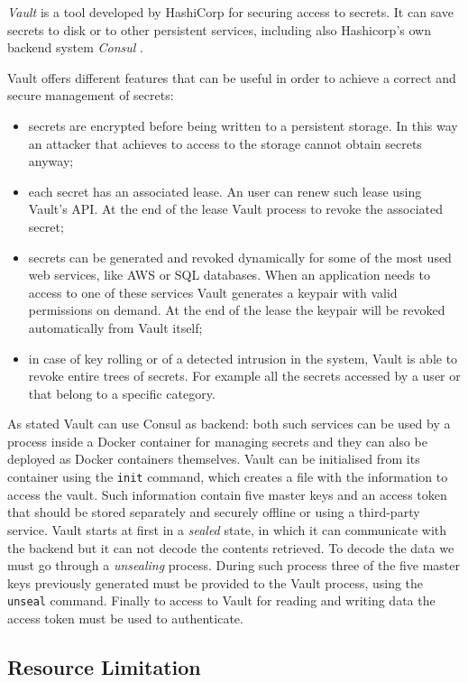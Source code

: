 \documentclass[a4paper,12pt]{article}
\newcommand{\code}[1]{\lstinline|#1|}
\begin{document}
\textit{Vault} \cite{hashicorp_vault} is a tool developed by HashiCorp for
securing access to secrets. It can save secrets to disk or to other persistent
services, including also Hashicorp's own backend system
\textit{Consul} \cite{hashicorp_consul}.\par Vault offers different features that
can be useful in order to achieve a correct and secure management of secrets:
\begin{itemize}
  \item secrets are encrypted before being written to a persistent storage. In
  this way an attacker that achieves to access to the storage cannot
  obtain secrets anyway;
  \item each secret has an associated lease. An user can renew such lease using
  Vault's API. At the end of the lease Vault process to revoke the associated
  secret;
  \item secrets can be generated and revoked dynamically for some of the most
  used web services, like AWS or SQL databases. When an application needs to
  access to one of these services Vault generates a keypair with valid
  permissions on demand. At the end of the lease the keypair will be revoked
  automatically from Vault itself;
  \item in case of key rolling or of a detected intrusion in the system, Vault
  is able to revoke entire trees of secrets. For example all the secrets
  accessed by a user or that belong to a specific category.
\end{itemize}
\par As stated Vault can use Consul as backend: both such services can be used by a process
inside a Docker container for managing secrets and they can also be deployed as
Docker containers themselves. Vault can be initialised from its container using
the \code{init} command, which creates a file with the information to access
the vault. Such information contain five master keys and an access token that
should  be stored separately and securely offline or using a third-party
service. Vault starts at first in a \textit{sealed} state, in which it can
communicate with the backend but it can not decode the contents retrieved. To
decode the data we must go through a \textit{unsealing} process. During such
process three of the five master keys previously generated must be provided to
the Vault process, using the \code{unseal} command. Finally to access to Vault
for reading and writing data the access token must be used to authenticate.  

\subsection{Resource Limitation}
\end{document}
